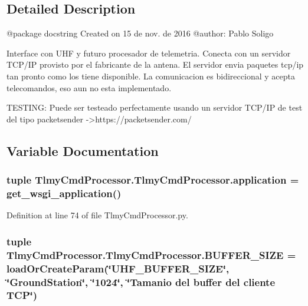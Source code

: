 \subsection{Detailed Description}
\begin{DoxyVerb}@package docstring
Created on 15 de nov. de 2016
@author: Pablo Soligo

Interface con UHF y futuro procesador de telemetria. Conecta con un servidor TCP/IP provisto por el fabricante de la 
antena. El servidor envia paquetes tcp/ip tan pronto como los tiene disponible. La comunicacion es bidireccional y acepta 
telecomandos, eso aun no esta implementado.

TESTING: Puede ser testeado perfectamente usando un servidor TCP/IP de test del tipo packetsender 
->https://packetsender.com/
\end{DoxyVerb}
 

\subsection{Variable Documentation}
\hypertarget{namespace_tlmy_cmd_processor_1_1_tlmy_cmd_processor_abc9fef542a08059c815604cf428eb8ea}{}
\subsubsection[{application}]{\setlength{\rightskip}{0pt plus 5cm}tuple Tlmy\+Cmd\+Processor.\+Tlmy\+Cmd\+Processor.\+application = get\+\_\+wsgi\+\_\+application()}\label{namespace_tlmy_cmd_processor_1_1_tlmy_cmd_processor_abc9fef542a08059c815604cf428eb8ea}


Definition at line 74 of file Tlmy\+Cmd\+Processor.\+py.

\hypertarget{namespace_tlmy_cmd_processor_1_1_tlmy_cmd_processor_ad6b870e079ada467cc4ac0b8f1f73039}{}
\subsubsection[{B\+U\+F\+F\+E\+R\+\_\+\+S\+I\+Z\+E}]{\setlength{\rightskip}{0pt plus 5cm}tuple Tlmy\+Cmd\+Processor.\+Tlmy\+Cmd\+Processor.\+B\+U\+F\+F\+E\+R\+\_\+\+S\+I\+Z\+E = load\+Or\+Create\+Param(\char`\"{}U\+H\+F\+\_\+\+B\+U\+F\+F\+E\+R\+\_\+\+S\+I\+Z\+E\char`\"{}, \char`\"{}Ground\+Station\char`\"{}, \char`\"{}1024\char`\"{}, \char`\"{}Tamanio del buffer del cliente T\+C\+P\char`\"{})}\label{namespace_tlmy_cmd_processor_1_1_tlmy_cmd_processor_ad6b870e079ada467cc4ac0b8f1f73039}


